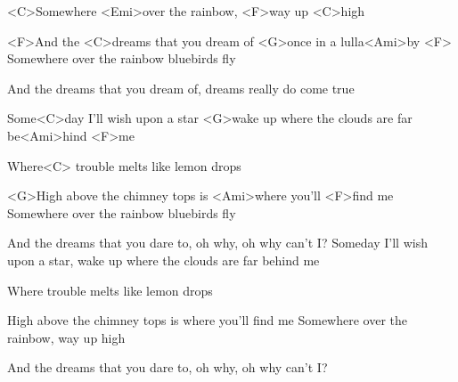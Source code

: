 

\zs

<C>Somewhere <Emi>over the rainbow, <F>way up <C>high

<F>And the <C>dreams that you dream of <G>once in a lulla<Ami>by <F>
\ks
\zs
Somewhere over the rainbow bluebirds fly

And the dreams that you dream of, dreams really do come true
\ks
\zr

Some<C>day I'll wish upon a star
<G>wake up where the clouds are far be<Ami>hind <F>me

Where<C> trouble melts like lemon drops

<G>High above the chimney tops is <Ami>where you'll <F>find me
\kr
\zs
Somewhere over the rainbow bluebirds fly

And the dreams that you dare to, oh why, oh why can't I?
\ks
\zr
Someday I'll wish upon a star, wake up where the clouds are far behind me

Where trouble melts like lemon drops

High above the chimney tops is where you'll find me
\kr
\zs
Somewhere over the rainbow, way up high

And the dreams that you dare to, oh why, oh why can't I?
\ks

\kp

